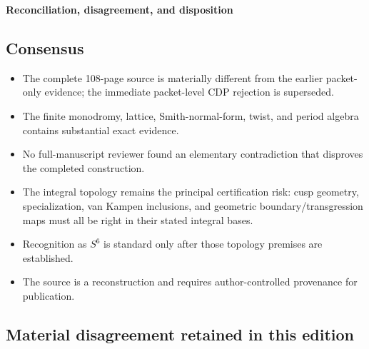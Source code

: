 

\clearpage
{}
\begin{center}{\Large\bfseries Reconciliation, disagreement, and disposition}\end{center}

\subsection*{Consensus}

\begin{itemize}[leftmargin=1.7em,itemsep=.45em,topsep=.35em]
\item The complete 108-page source is materially different from the earlier packet-only evidence; the immediate packet-level CDP rejection is superseded.
\item The finite monodromy, lattice, Smith-normal-form, twist, and period algebra contains substantial exact evidence.
\item No full-manuscript reviewer found an elementary contradiction that disproves the completed construction.
\item The integral topology remains the principal certification risk: cusp geometry, specialization, van Kampen inclusions, and geometric boundary/transgression maps must all be right in their stated integral bases.
\item Recognition as $S^6$ is standard only after those topology premises are established.
\item The source is a reconstruction and requires author-controlled provenance for publication.
\end{itemize}

\subsection*{Material disagreement retained in this edition}

